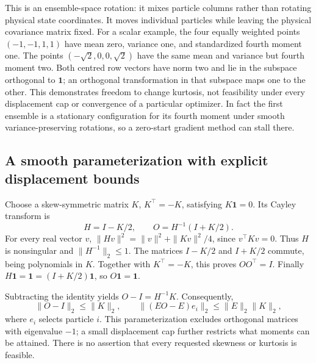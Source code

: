 \documentclass[11pt,a4paper]{article}
\newcommand{\one}{\mathbf 1}
\begin{document}
This is an ensemble-space rotation: it mixes particle columns rather than
rotating physical state coordinates. It moves individual particles while
leaving the physical covariance matrix fixed. For a scalar example, the
four equally weighted points \((-1,-1,1,1)\) have mean zero, variance one,
and standardized fourth moment one. The points
\((-\sqrt2,0,0,\sqrt2)\) have the same mean and variance but fourth moment
two. Both centred row vectors have norm two and lie in the subspace
orthogonal to \(\one\); an orthogonal transformation in that subspace
maps one to the other. This demonstrates freedom to change kurtosis,
not feasibility under every displacement cap or convergence of a
particular optimizer. In fact the first ensemble is a stationary
configuration for its fourth moment under smooth variance-preserving
rotations, so a zero-start gradient method can stall there.

\subsection{A smooth parameterization with explicit displacement bounds}

Choose a skew-symmetric matrix \(K\), \(K^\top=-K\), satisfying \(K\one=0\).
Its Cayley transform is
\begin{equation}
\label{eq:cayley}
 H=I-K/2,\qquad O=H^{-1}(I+K/2).
\end{equation}
For every real vector \(v\),
\(\|Hv\|^2=\|v\|^2+\|Kv\|^2/4\), since \(v^\top Kv=0\).
Thus \(H\) is nonsingular and \(\|H^{-1}\|_2\leq1\).
The matrices \(I-K/2\) and \(I+K/2\) commute, being polynomials in \(K\).
Together with \(K^\top=-K\), this proves \(OO^\top=I\).
Finally \(H\one=\one=(I+K/2)\one\), so \(O\one=\one\).

Subtracting the identity yields \(O-I=H^{-1}K\). Consequently,
\begin{equation}
\label{eq:cayley-bound}
 \|O-I\|_2\leq\|K\|_2,\qquad
 \|(EO-E)e_i\|_2\leq\|E\|_2\|K\|_2,
\end{equation}
where \(e_i\) selects particle \(i\).
This parameterization excludes orthogonal matrices with eigenvalue \(-1\);
a small displacement cap further restricts what moments can be attained.
There is no assertion that every requested skewness or kurtosis is feasible.
\end{document}
